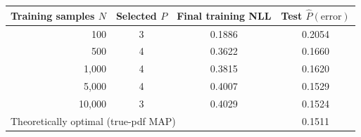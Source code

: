 \begin{tabular}{rccc}
\toprule
Training samples $N$ & Selected $P$ & Final training NLL & Test $\hat P(\text{error})$ \\
\midrule
100 & 3 & 0.1886 & 0.2054 \\
500 & 4 & 0.3622 & 0.1660 \\
1,000 & 4 & 0.3815 & 0.1620 \\
5,000 & 4 & 0.4007 & 0.1529 \\
10,000 & 3 & 0.4029 & 0.1524 \\
\midrule
\multicolumn{3}{l}{Theoretically optimal (true-pdf MAP)} & 0.1511 \\
\bottomrule
\end{tabular}
